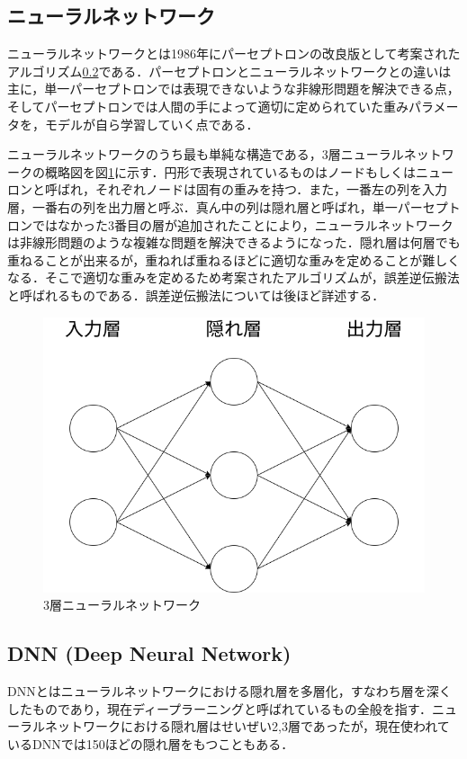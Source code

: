 \documentclass[a4j, 11pt]{jreport}
\begin{document}
\subsection{ニューラルネットワーク}
ニューラルネットワークとは1986年にパーセプトロンの改良版として考案されたアルゴリズム\ref{}である．パーセプトロンとニューラルネットワークとの違いは主に，単一パーセプトロンでは表現できないような非線形問題を解決できる点，そしてパーセプトロンでは人間の手によって適切に定められていた重みパラメータを，モデルが自ら学習していく点である．

ニューラルネットワークのうち最も単純な構造である，3層ニューラルネットワークの概略図を図\ref{fig:3nn}に示す．円形で表現されているものはノードもしくはニューロンと呼ばれ，それぞれノードは固有の重みを持つ．また，一番左の列を入力層，一番右の列を出力層と呼ぶ．真ん中の列は隠れ層と呼ばれ，単一パーセプトロンではなかった3番目の層が追加されたことにより，ニューラルネットワークは非線形問題のような複雑な問題を解決できるようになった．隠れ層は何層でも重ねることが出来るが，重ねれば重ねるほどに適切な重みを定めることが難しくなる．そこで適切な重みを定めるため考案されたアルゴリズムが，誤差逆伝搬法と呼ばれるものである．誤差逆伝搬法については後ほど詳述する．

\begin{figure}[H]
 \centering
 \includegraphics[width=0.7\hsize, keepaspectratio]{images/drawio/3nn.png}
 \caption{3層ニューラルネットワーク}
 \label{fig:3nn}
\end{figure}

\subsection{DNN (Deep Neural Network)}
DNNとはニューラルネットワークにおける隠れ層を多層化，すなわち層を深くしたものであり，現在ディープラーニングと呼ばれているもの全般を指す．ニューラルネットワークにおける隠れ層はせいぜい2,3層であったが，現在使われているDNNでは150ほどの隠れ層をもつこともある．
\end{document}
